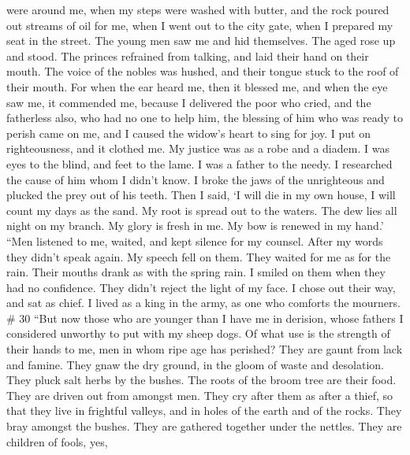 were around me,  when my steps were washed with butter, and
the rock poured out streams of oil for me,  when I went out
to the city gate, when I prepared my seat in the street. 
The young men saw me and hid themselves. The aged rose up and stood.
 The princes refrained from talking, and laid their hand on
their mouth.  The voice of the nobles was hushed, and their
tongue stuck to the roof of their mouth.  For when the ear
heard me, then it blessed me, and when the eye saw me, it commended me,
 because I delivered the poor who cried, and the fatherless
also, who had no one to help him,  the blessing of him who
was ready to perish came on me, and I caused the widow's heart to sing
for joy.  I put on righteousness, and it clothed me. My
justice was as a robe and a diadem.  I was eyes to the
blind, and feet to the lame.  I was a father to the needy.
I researched the cause of him whom I didn't know.  I broke
the jaws of the unrighteous and plucked the prey out of his teeth.
 Then I said, `I will die in my own house, I will count my
days as the sand.  My root is spread out to the waters. The
dew lies all night on my branch.  My glory is fresh in me.
My bow is renewed in my hand.'  ``Men listened to me,
waited, and kept silence for my counsel.  After my words
they didn't speak again. My speech fell on them.  They
waited for me as for the rain. Their mouths drank as with the spring
rain.  I smiled on them when they had no confidence. They
didn't reject the light of my face.  I chose out their way,
and sat as chief. I lived as a king in the army, as one who comforts the
mourners. \# 30  ``But now those who are younger than I have
me in derision, whose fathers I considered unworthy to put with my sheep
dogs.  Of what use is the strength of their hands to me, men
in whom ripe age has perished?  They are gaunt from lack and
famine. They gnaw the dry ground, in the gloom of waste and desolation.
 They pluck salt herbs by the bushes. The roots of the broom
tree are their food.  They are driven out from amongst men.
They cry after them as after a thief,  so that they live in
frightful valleys, and in holes of the earth and of the rocks.
 They bray amongst the bushes. They are gathered together
under the nettles.  They are children of fools, yes,
